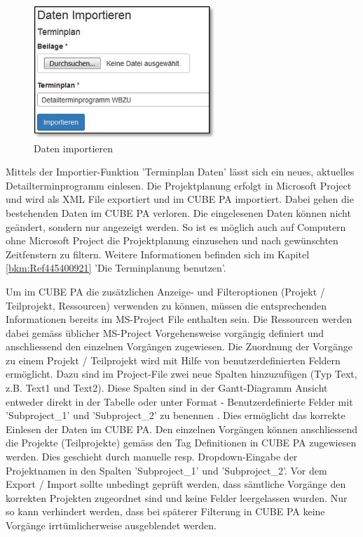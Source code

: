 \begin{figure}
\vspace{-15pt}
\includegraphics[height=50mm]{../chapters/12_Importieren/pictures/12-1_DatenImportieren.jpg}
\caption{Daten importieren}
\end{figure}
Mittels der Importier-Funktion 'Terminplan Daten' lässt sich ein neues, aktuelles Detailterminprogramm einlesen. Die Projektplanung erfolgt in Microsoft Project und wird als XML File exportiert und im CUBE PA importiert. Dabei gehen die bestehenden Daten im CUBE PA verloren. Die eingelesenen Daten können nicht geändert, sondern nur angezeigt werden. So ist es möglich auch auf Computern ohne Microsoft Project die Projektplanung einzusehen und nach gewünschten Zeitfenstern zu filtern. Weitere Informationen befinden sich im Kapitel \ref{bkm:Ref445400921} 'Die Terminplanung benutzen'.

\vspace{\baselineskip}

Um im CUBE PA die zusätzlichen Anzeige- und Filteroptionen (Projekt / Teilprojekt, Ressourcen) verwenden zu können, müssen die entsprechenden Informationen bereits im MS-Project File enthalten sein. Die Ressourcen werden dabei gemäss üblicher MS-Project Vorgehensweise vorgängig definiert und anschliessend den einzelnen Vorgängen zugewiesen. Die Zuordnung der Vorgänge zu einem Projekt / Teilprojekt wird mit Hilfe von benutzerdefinierten Feldern ermöglicht. Dazu sind im Project-File zwei neue Spalten hinzuzufügen (Typ Text, z.B. Text1 und Text2). Diese Spalten sind in der Gantt-Diagramm Ansicht entweder direkt in der Tabelle oder unter Format - Benutzerdefinierte Felder mit 'Subproject\_1' und 'Subproject\_2' zu benennen . Dies ermöglicht das korrekte Einlesen der Daten im CUBE PA. Den einzelnen Vorgängen können anschliessend die Projekte (Teilprojekte) gemäss den Tag Definitionen in CUBE PA zugewiesen werden. Dies geschieht durch manuelle resp. Dropdown-Eingabe der Projektnamen in den Spalten 'Subproject\_1' und 'Subproject\_2'. Vor dem Export / Import sollte unbedingt geprüft werden, dass sämtliche Vorgänge den korrekten Projekten zugeordnet sind und keine Felder leergelassen wurden. Nur so kann verhindert werden, dass bei späterer Filterung in CUBE PA keine Vorgänge irrtümlicherweise ausgeblendet werden.

